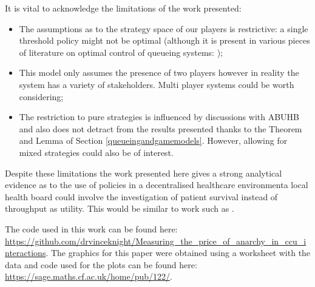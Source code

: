 \documentclass{article}
\begin{document}
It is vital to acknowledge the limitations of the work presented:

\begin{itemize}
    \item The assumptions as to the strategy space of our players is restrictive: a single threshold policy might not be optimal (although it is present in various pieces of literature on optimal control of queueing systems: \cite{naor1969regulation, shone2013comparisons});
    \item This model only assumes the presence of two players however in reality the system has a variety of stakeholders. Multi player systems could be worth considering;
    \item The restriction to pure strategies is influenced by discussions with ABUHB and also does not detract from the results presented thanks to the Theorem and Lemma of Section \ref{queueingandgamemodels}.  However, allowing for mixed strategies could also be of interest.
\end{itemize}

Despite these limitations the work presented here gives a strong analytical evidence as to the use of policies in a decentralised healthcare environmenta local health board could involve the investigation of patient survival instead of throughput as utility.
This would be similar to work such as \cite{erkut2008ambulance, knight2012ambulance}.

The code used in this work can be found here: \url{https://github.com/drvinceknight/Measuring_the_price_of_anarchy_in_ccu_interactions}.
The graphics for this paper were obtained using \cite{Hunter:2007, sage} a worksheet with the data and code used for the plots can be found here: \url{https://sage.maths.cf.ac.uk/home/pub/122/}.

\newpage


\end{document}
